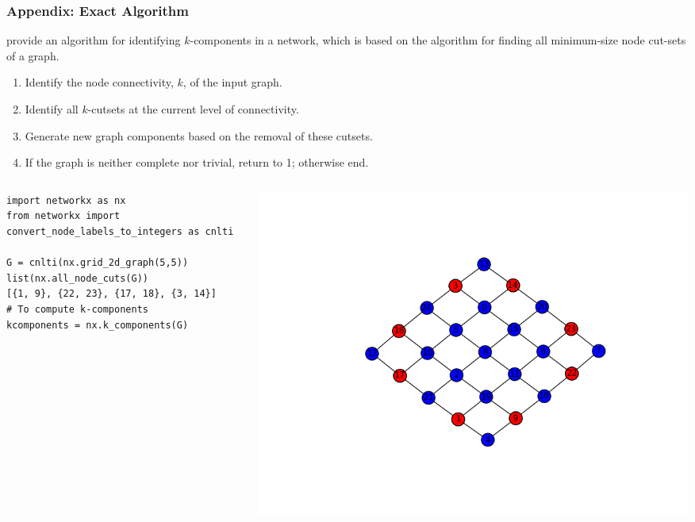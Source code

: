 \documentclass[ignorenonframetext,red,8pt,notes=hide]{beamer}
\begin{document}
\begin{frame}[fragile]
\frametitle{Appendix: Exact Algorithm}

\citet[appendix A]{moody:2003} provide an algorithm for identifying $k$-components in a network, which is based on the \citet{kanevsky:1993} algorithm for finding all minimum-size node cut-sets of a graph.

\begin{enumerate}

\item Identify the node connectivity, $k$, of the input graph.

\item Identify all $k$-cutsets at the current level of connectivity.

\item Generate new graph components based on the removal of these cutsets.

\item If the graph is neither complete nor trivial, return to 1; otherwise end.

\end{enumerate}


\begin{columns}[c]
\begin{column}{0.3\textwidth}
\begin{scriptsize}
\begin{lstlisting}
import networkx as nx
from networkx import convert_node_labels_to_integers as cnlti

G = cnlti(nx.grid_2d_graph(5,5))
list(nx.all_node_cuts(G))
[{1, 9}, {22, 23}, {17, 18}, {3, 14}]
# To compute k-components
kcomponents = nx.k_components(G)
\end{lstlisting}
\end{scriptsize}

\end{column}

\begin{column}{0.7\textwidth}
\begin{center}
\includegraphics[scale=0.45]{img/grid}
\end{center}


\end{column}
\end{columns}
\end{frame}
\end{document}

